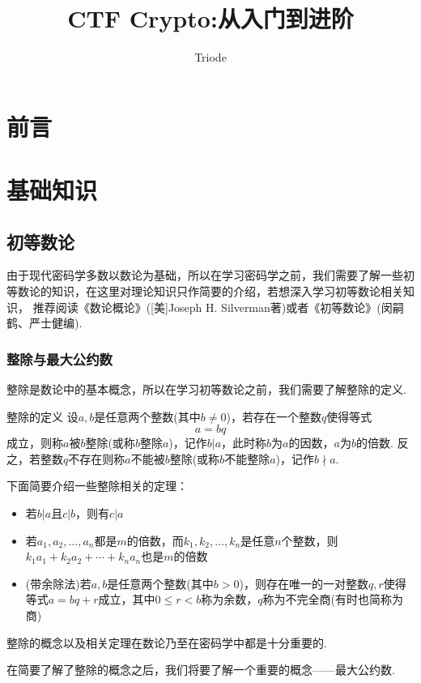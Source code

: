 \documentclass{book}
\numberwithin{equation}{subsubsection}
\begin{document}
\title{CTF Crypto:从入门到进阶}
\author{Triode}
\date{}
\maketitle

\tableofcontents
\newpage
{}

\chapter{前言}
\newpage

\chapter{基础知识}
\section{初等数论}
由于现代密码学多数以数论为基础，所以在学习密码学之前，我们需要了解一些初等数论的知识，在这里对理论知识只作简要的介绍，若想深入学习初等数论相关知识，
推荐阅读《数论概论》([美]Joseph H. Silverman著)或者《初等数论》(闵嗣鹤、严士健编).
\subsection{整除与最大公约数}
整除是数论中的基本概念，所以在学习初等数论之前，我们需要了解整除的定义.
\begin{concept}{整除的定义}
设$a,b$是任意两个整数(其中$b\neq 0$)，若存在一个整数$q$使得等式
\begin{equation}
    a = bq
    \nonumber
\end{equation}
成立，则称$a$被$b$整除(或称$b$整除$a$)，记作$b|a$，此时称$b$为$a$的因数，$a$为$b$的倍数.
反之，若整数$q$不存在则称$a$不能被$b$整除(或称$b$不能整除$a$)，记作$b\nmid a$.\\
\end{concept}
下面简要介绍一些整除相关的定理：
\begin{itemize}
    \item 若$b|a$且$c|b$，则有$c|a$
    \item 若$a_1, a_2,\ldots,a_n$都是$m$的倍数，而$k_1,k_2,\ldots,k_n$是任意$n$个整数，则$k_1a_1+k_2a_2+\cdots+k_na_n$也是$m$的倍数
    \item (带余除法)若$a,b$是任意两个整数(其中$b>0$)，则存在唯一的一对整数$q,r$使得等式$a=bq+r$成立，其中$0\leq r < b$称为余数，$q$称为不完全商(有时也简称为商)
\end{itemize}
整除的概念以及相关定理在数论乃至在密码学中都是十分重要的.\par
在简要了解了整除的概念之后，我们将要了解一个重要的概念——最大公约数.
\end{document}

